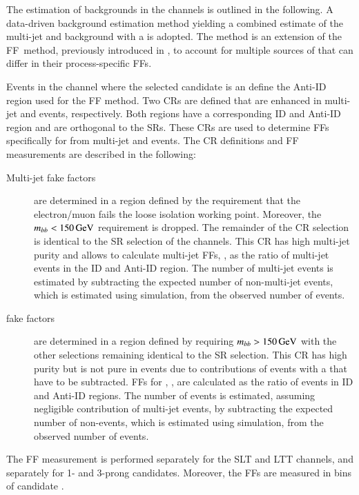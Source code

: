 The estimation of \jettotauhadvis backgrounds in the \lephad channels is
outlined in the following. A data-driven background estimation method yielding a
combined estimate of the multi-jet and \ttbar background with a \faketauhadvis
is adopted. The method is an extension of the FF~method, previously introduced
in , to account for multiple sources of \faketauhadvis
that can differ in their process-specific FFs.

Events in the \lephad channel where the selected \tauhadvis candidate is an
\antitau define the Anti-ID region used for the FF method. Two CRs are defined
that are enhanced in multi-jet and \ttbar events, respectively. Both regions
have a corresponding ID and Anti-ID region and are orthogonal to the SRs. These
CRs are used to determine FFs specifically for \faketauhadvis from multi-jet and
\ttbar events. The CR definitions and FF measurements are described in the
following:
\begin{description}

\item[Multi-jet fake factors] are determined in a region defined by the
  requirement that the electron/muon fails the loose isolation working
  point. Moreover, the $m_{bb} < \SI{150}{\ensuremath{\text{GeV}}}$ requirement is dropped. The
  remainder of the CR selection is identical to the SR selection of the \lephad
  channels. This CR has high multi-jet purity and allows to calculate multi-jet
  FFs, \FFqcd, as the ratio of multi-jet events in the ID and Anti-ID
  region. The number of multi-jet events is estimated by subtracting the
  expected number of non-multi-jet events, which is estimated using simulation,
  from the observed number of events.

\item[\ttbar fake factors] are determined in a region defined by requiring
  $m_{bb} > \SI{150}{\ensuremath{\text{GeV}}}$ with the other selections remaining identical to the
  SR selection. This CR has high \ttbar purity but is not pure in \ttbarFakes
  events due to contributions of \ttbar events with a \truetauhadvis that have
  to be subtracted. FFs for \ttbar, \FFttbar, are calculated as the ratio of
  \ttbarFakes events in ID and Anti-ID regions. The number of \ttbarFakes events
  is estimated, assuming negligible contribution of multi-jet events, by
  subtracting the expected number of non-\ttbarFakes events, which is estimated
  using simulation, from the observed number of events.

\end{description}
The FF measurement is performed separately for the \lephad SLT and LTT channels,
and separately for 1- and 3-prong \tauhadvis candidates. Moreover, the FFs are
measured in bins of \tauhadvis candidate \pT.

